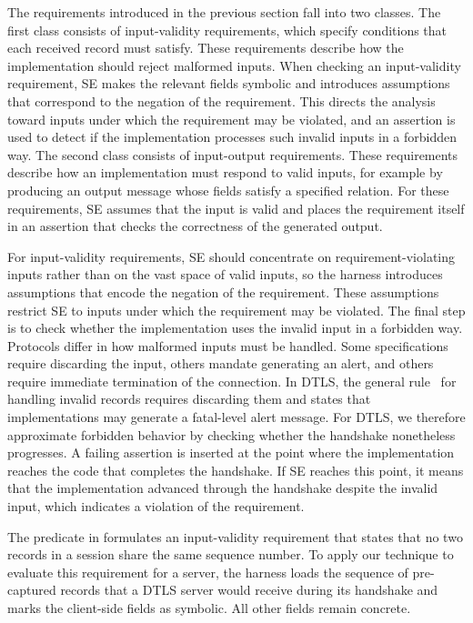 The requirements introduced in the previous section fall into two classes.
The first class consists of input-validity requirements, which specify conditions that each received record must satisfy. 
These requirements describe how the implementation should reject malformed inputs. 
When checking an input-validity requirement, SE makes the relevant fields symbolic and introduces assumptions that correspond to the negation of the requirement.
This directs the analysis toward inputs under which the requirement may be violated, and an assertion is used to detect if the implementation processes such invalid inputs in a forbidden way. 
The second class consists of input-output requirements. 
These requirements describe how an implementation must respond to valid inputs, for example by producing an output message whose fields satisfy a specified relation. 
For these requirements, SE assumes that the input is valid and places the requirement itself in an assertion that checks the correctness of the generated output.

For input-validity requirements, SE should concentrate on requirement-violating inputs rather than on the vast space of valid inputs, so the harness introduces assumptions that encode the negation of the requirement.
These assumptions restrict SE to inputs under which the requirement may be violated.
The final step is to check whether the implementation uses the invalid input in a forbidden way.
Protocols differ in how malformed inputs must be handled.
Some specifications require discarding the input, others mandate generating an alert, and others require immediate termination of the connection.
In DTLS, the general rule~\cite[p. 14]{RFC6347} for handling invalid records requires discarding them and states that implementations may generate a fatal-level alert message.
For DTLS, we therefore approximate forbidden behavior by checking whether the handshake nonetheless progresses.
A failing assertion is inserted at the point where the implementation reaches the code that completes the handshake.
If SE reaches this point, it means that the implementation advanced through the handshake despite the invalid input, which indicates a violation of the requirement.

The predicate in  formulates an input-validity requirement that states that no two records in a session share the same sequence number.
To apply our technique to evaluate this requirement for a server, the harness loads the sequence of pre-captured records that a DTLS server would receive during its handshake and marks the client-side  fields as symbolic.
All other fields remain concrete.

